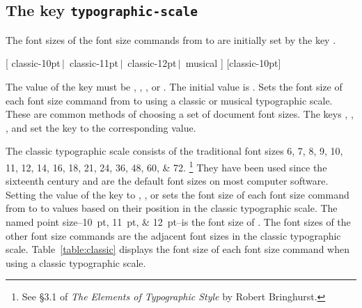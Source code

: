 \documentclass{beery}
\begin{document}
\subsection
  {%
    The key
    \texorpdfstring
      {\texttt{typographic-scale}}
      {typographic-scale}%
  }
\label{subsec:typographicscale}

The font sizes of the font size commands from  to  are initially set by the key .

  [%
    classic-10pt$\,\vert\,$\allowbreak
    classic-11pt$\,\vert\,$\allowbreak
    classic-12pt$\,\vert\,$\allowbreak\hspace*{1.5em}%
    musical%
  ]
  [classic-10pt]
\newline
{}
\newline
{}
\newline
{}
\nopagebreak\newline
{}

The value of the key  must be , , , or .
The initial value is .
Sets the font size of each font size command from  to  using a classic or musical typographic scale.
These are common methods of choosing a set of document font sizes.
The keys , , , and  set the key  to the corresponding value.

The classic typographic scale consists of the traditional font sizes
\numlist{6;7;8;9;10;11;12;14;16;18;21;24;36;48;60;72}.%
\footnote{See \S3.1 of \textit{The Elements of Typographic Style} by Robert Bringhurst.}
They have been used since the sixteenth century and are the default font sizes on most computer software.
Setting the value of the key  to , , or  sets the font size of each font size command from  to  to values based on their position in the classic typographic scale.
The named point size\---\qtylist[list-final-separator={, or }]{10;11;12}{pt}\---is the font size of .
The font sizes of the other font size commands are the adjacent font sizes in the classic typographic scale.
Table~\ref{table:classic} displays the font size of each font size command when using a classic typographic scale.


\end{document}

